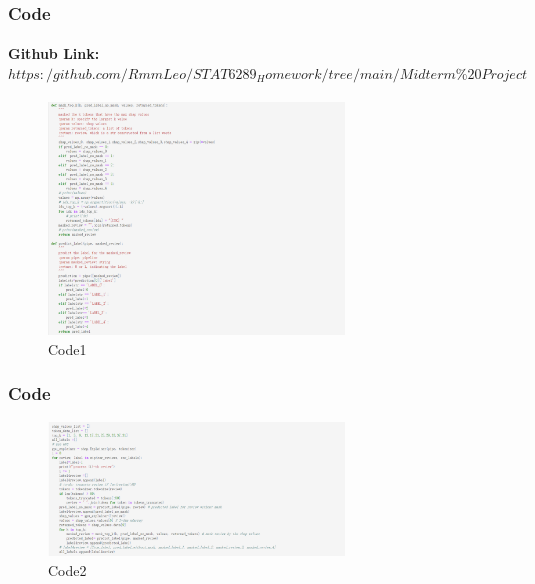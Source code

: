 \documentclass{beamer}
\begin{document}
\begin{frame}
    \frametitle{Code}
    \framesubtitle{Github Link: \\ $https:/github.com/RmmLeo/STAT6289_Homework/tree/main/Midterm\%20Project$}
    \begin{figure}
        \centering
            \includegraphics[width=0.7\textwidth]{Code1.png}
            \caption{Code1}
            \label{fig:MaskedExample}
    \end{figure}
\end{frame}

\begin{frame}
    \frametitle{Code}
    \begin{figure}
        \centering
            \includegraphics[width=0.7\textwidth]{Code2.png}
            \caption{Code2}
            \label{fig:MaskedExample}
    \end{figure}
\end{frame}
\end{document}
